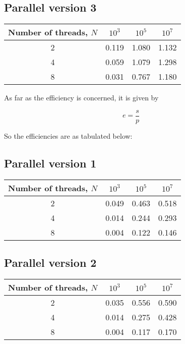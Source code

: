 \documentclass[a4paper]{article}
\begin{document}
\subsection{Parallel version 3}

\begin{center}
    \begin{tabular}{|c|c|c|c|}
        \hline
        Number of threads, $N$ & $10^3$ & $10^5$ & $10^7$ \\
        \hline
        2 & 0.119 & 1.080 & 1.132 \\
        \hline
        4 & 0.059 & 1.079 & 1.298 \\
        \hline
        8 & 0.031 & 0.767 & 1.180 \\
        \hline
    \end{tabular}
\end{center}

As far as the efficiency is concerned, it is given by

\[
    e = \frac{s}{p}
\]

So the efficiencies are as tabulated below:

\subsection{Parallel version 1}

\begin{center}
    \begin{tabular}{|c|c|c|c|}
        \hline
        Number of threads, $N$ & $10^3$ & $10^5$ & $10^7$ \\
        \hline
        2 & 0.049 & 0.463 & 0.518 \\
        \hline
        4 & 0.014 & 0.244 & 0.293 \\
        \hline
        8 & 0.004 & 0.122 & 0.146 \\
        \hline
    \end{tabular}
\end{center}

\subsection{Parallel version 2}

\begin{center}
    \begin{tabular}{|c|c|c|c|}
        \hline
        Number of threads, $N$ & $10^3$ & $10^5$ & $10^7$ \\
        \hline
        2 & 0.035 & 0.556 & 0.590 \\
        \hline
        4 & 0.014 & 0.275 & 0.428 \\
        \hline
        8 & 0.004 & 0.117 & 0.170 \\
        \hline
    \end{tabular}
\end{center}
\end{document}
